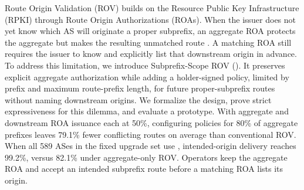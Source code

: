 Route Origin Validation (ROV) builds on the Resource Public Key Infrastructure (RPKI) through Route Origin Authorizations (ROAs). When the issuer does not yet know which AS will originate a proper subprefix, an aggregate ROA protects the aggregate but makes the resulting unmatched route \invalid{}. A matching ROA still requires the issuer to know and explicitly list that downstream origin in advance. To address this limitation, we introduce Subprefix-Scope ROV (\ssrov{}). It preserves explicit aggregate authorization while adding a holder-signed policy, limited by prefix and maximum route-prefix length, for future proper-subprefix routes without naming downstream origins. We formalize the design, prove strict expressiveness for this dilemma, and evaluate a prototype. With aggregate and downstream ROA issuance each at 50\%, configuring \ssrov{} policies for 80\% of aggregate prefixes leaves 79.1\% fewer conflicting routes on average than conventional ROV. When all 589 ASes in the fixed upgrade set use \ssrov{}, intended-origin delivery reaches 99.2\%, versus 82.1\% under aggregate-only ROV. Operators keep the aggregate ROA and accept an intended subprefix route before a matching ROA lists its origin.
